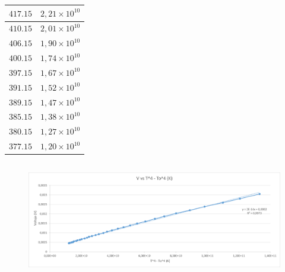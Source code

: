 \documentclass[letterpaper, 12pt]{article}
\begin{document}
\begin{table}[H]
\begin{tabularx}{\linewidth}{|>{\centering\arraybackslash}X|>{\centering\arraybackslash}X|}
            $417.15$       & $2,21 \times 10^{10}$            \\\hline
            $410.15$       & $2,01 \times 10^{10}$            \\\hline
            $406.15$       & $1,90 \times 10^{10}$            \\\hline
            $400.15$       & $1,74 \times 10^{10}$            \\\hline
            $397.15$       & $1,67 \times 10^{10}$            \\\hline
            $391.15$       & $1,52 \times 10^{10}$            \\\hline
            $389.15$       & $1,47 \times 10^{10}$            \\\hline
            $385.15$       & $1,38 \times 10^{10}$            \\\hline
            $380.15$       & $1,27 \times 10^{10}$            \\\hline
            $377.15$       & $1,20 \times 10^{10}$            \\\hline
      \end{tabularx}
\end{table}

\subsection{}

\begin{figure}[H]
      \begin{center}
            \includegraphics[width=\linewidth]{./Images/grafico2.png}
            \caption{}
      \end{center}
\end{figure}

\subsection{}
\end{document}
